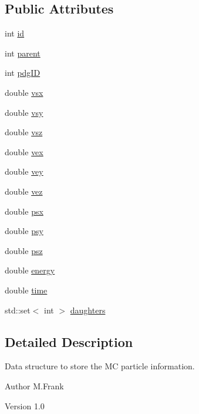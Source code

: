 \subsection*{Public Attributes}
\begin{DoxyCompactItemize}
\item 
int \hyperlink{class_d_d4hep_1_1_d_d_eve_particle_a230cb6bfdbe03751bc0d2b84da8d32b3}{id}
\item 
int \hyperlink{class_d_d4hep_1_1_d_d_eve_particle_aa405afce24519cce61999543be3f0d33}{parent}
\item 
int \hyperlink{class_d_d4hep_1_1_d_d_eve_particle_af205b9bbb31c48d31d62a2c5013ff4cd}{pdgID}
\item 
double \hyperlink{class_d_d4hep_1_1_d_d_eve_particle_a28dbdeb3997f9b8342ccd4c9e6991a92}{vsx}
\item 
double \hyperlink{class_d_d4hep_1_1_d_d_eve_particle_a44cd9286a2e84819c40fc89f426fe322}{vsy}
\item 
double \hyperlink{class_d_d4hep_1_1_d_d_eve_particle_a8b93479f6e6812a6902a8574fce930e9}{vsz}
\item 
double \hyperlink{class_d_d4hep_1_1_d_d_eve_particle_ae4631ff73de167405ea1c680f5217172}{vex}
\item 
double \hyperlink{class_d_d4hep_1_1_d_d_eve_particle_a3e6f78f4ccc5d78ae52a28c33fcf0b44}{vey}
\item 
double \hyperlink{class_d_d4hep_1_1_d_d_eve_particle_ad573d5c2205c4d4c6908637c34f9233a}{vez}
\item 
double \hyperlink{class_d_d4hep_1_1_d_d_eve_particle_afbc3020b2ad0f4df7b3c36929d4cd11e}{psx}
\item 
double \hyperlink{class_d_d4hep_1_1_d_d_eve_particle_a5e678bef386cffdab92eaebca644cdd1}{psy}
\item 
double \hyperlink{class_d_d4hep_1_1_d_d_eve_particle_ac1ff170f07e4abcecc63bf1c31294de4}{psz}
\item 
double \hyperlink{class_d_d4hep_1_1_d_d_eve_particle_ac874addd7f825b87415e65722860743d}{energy}
\item 
double \hyperlink{class_d_d4hep_1_1_d_d_eve_particle_ad15d69211063590b587d7ba6ff0d8726}{time}
\item 
std::set$<$ int $>$ \hyperlink{class_d_d4hep_1_1_d_d_eve_particle_a6cd73e254f4338306c06c54e1a9f2843}{daughters}
\end{DoxyCompactItemize}


\subsection{Detailed Description}
Data structure to store the MC particle information. \begin{DoxyAuthor}{Author}
M.Frank 
\end{DoxyAuthor}
\begin{DoxyVersion}{Version}
1.0 
\end{DoxyVersion}


